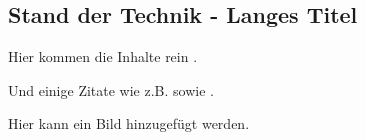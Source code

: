\begin{showRelatedWork}%
%
\chapter[Stand der Technik - Kurztitel für Inhaltsverzeichnis und Kolumnentitel]{Stand der Technik - Langes Titel}%
\label{chap:StandDerTechnik}
%
Hier kommen die Inhalte rein .

%
%
Und einige Zitate wie z.B. 
\cite{BarShalom-Tse-TICEWPDA-Automatica-75,BarShalom-TrackingMethodsin-1978,Bar-Shalom-AC1984-JPDA,BarShalom-MTMST-1990,BarShalom-MTT-Buch-Band2,BarShalom-MMTAA-Buch-2000}
sowie
\cite{Zomotor-Fahrverhalten-1991}.

Hier kann ein Bild hinzugefügt werden.

\myTodoImg
%
\end{showRelatedWork}%